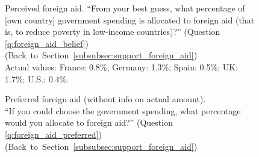 \begin{figure}[h!]
    \caption[Perceived foreign aid]{Perceived foreign aid. ``From your best guess, what percentage of [own country] government spending is allocated to foreign aid (that is, to reduce poverty in low-income countries)?'' (Question \ref{q:foreign_aid_belief})  \hfill (Back~to~Section~\ref{subsubsec:support_foreign_aid}) \\ Actual values: France: 0.8\%; Germany: 1.3\%; Spain: 0.5\%; UK: 1.7\%; U.S.: 0.4\%.}\label{fig:foreign_aid_belief}
\end{figure}

\begin{figure}[h!]
    \caption[Preferred foreign aid (without info on actual amount)]{Preferred foreign aid (without info on actual amount). \\ ``If you could choose the government spending, what percentage would you allocate
    to foreign aid?'' (Question \ref{q:foreign_aid_preferred})  \hfill (Back~to~Section~\ref{subsubsec:support_foreign_aid})}\label{fig:foreign_aid_preferred_no_info}
\end{figure}

